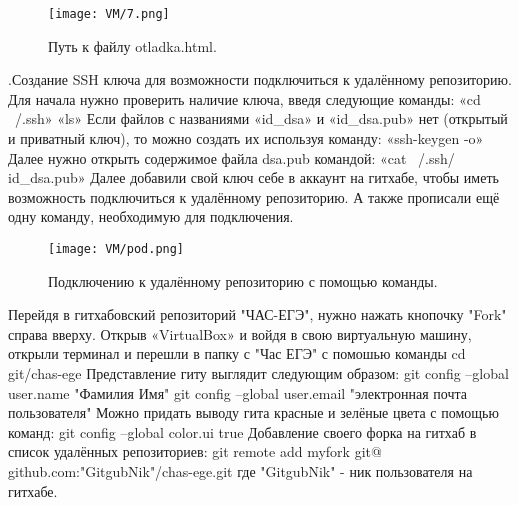 \begin{figure}[h]
		\centering
		\texttt{[image: VM/7.png]}
\caption{Путь к файлу otladka.html.}
\label{ris:image}
\end{figure}

.\quad  Создание SSH ключа для возможности подключиться к удалённому репозиторию.
\newline \quad Для начала нужно проверить наличие ключа, введя следующие команды:
\newline «cd ~/.ssh»
\newline «ls»
\newline \quad Если файлов с названиями «id\_dsa» и «id\_dsa.pub» нет (открытый и приватный ключ), то можно создать их используя команду:
\newline  «ssh-keygen -o»
\newline \quad Далее нужно открыть содержимое файла dsa.pub командой:
\newline  «cat ~/.ssh/ id\_dsa.pub»
\newline \quad Далее добавили свой ключ себе в аккаунт на гитхабе, чтобы иметь возможность подключиться к удалённому репозиторию. А также прописали ещё одну команду, необходимую для подключения.

\begin{figure}[h]
		\centering
		\texttt{[image: VM/pod.png]}
\caption{Подключению к удалённому репозиторию с помощью команды.}
\label{ris:image}
\end{figure}

\quad Перейдя в гитхабовский репозиторий "ЧАС-ЕГЭ", нужно нажать кнопочку "Fork" справа вверху.
\newline \quad Открыв «VirtualBox» и войдя в свою виртуальную машину, открыли терминал и перешли в папку с "Час ЕГЭ" с помошью команды cd git/chas-ege
\newline \quad Представление гиту выглядит следующим образом:
\newline git config --global user.name "Фамилия Имя"
\newline git config --global user.email "электронная почта пользователя"
Можно придать выводу гита красные и зелёные цвета с помощью команд:
git config --global color.ui true
Добавление своего форка на гитхаб в список удалённых репозиториев:
git remote add myfork git@ github.com:"GitgubNik"/chas-ege.git
где "GitgubNik" - ник пользователя на гитхабе. 

